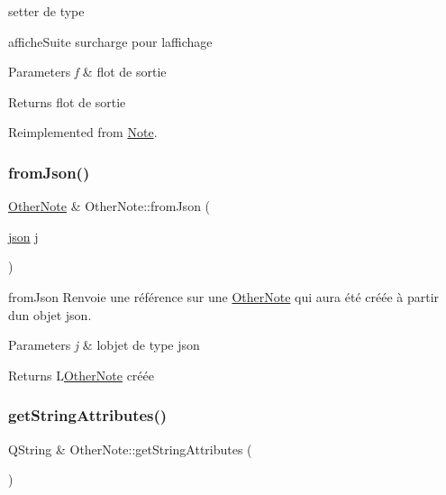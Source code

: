 setter de type 

affiche\+Suite surcharge pour l\textquotesingle{}affichage 
\begin{DoxyParams}{Parameters}
{\em f} & flot de sortie \\
\hline
\end{DoxyParams}
\begin{DoxyReturn}{Returns}
flot de sortie 
\end{DoxyReturn}


Reimplemented from \hyperlink{classNote_ad3c0d7e48ef8244ead577128993a6f1f}{Note}.

\mbox{\label{classOtherNote_ab0a366aa561a511646c6ac3340fd1009}} 
\subsubsection{\texorpdfstring{from\+Json()}{fromJson()}}
{\footnotesize\ttfamily \hyperlink{classOtherNote}{Other\+Note} \& Other\+Note\+::from\+Json (\begin{DoxyParamCaption}\item[{\hyperlink{classnlohmann_1_1basic__json}{json}}]{j }\end{DoxyParamCaption})\hspace{0.3cm}{\ttfamily [static]}}



from\+Json Renvoie une référence sur une \hyperlink{classOtherNote}{Other\+Note} qui aura été créée à partir d\textquotesingle{}un objet json. 


\begin{DoxyParams}{Parameters}
{\em j} & l\textquotesingle{}objet de type json \\
\hline
\end{DoxyParams}
\begin{DoxyReturn}{Returns}
L\textquotesingle{}\hyperlink{classOtherNote}{Other\+Note} créée 
\end{DoxyReturn}
\mbox{\label{classOtherNote_a3f475cf0cfc1a9cd8785618c0a7f3496}} 
\subsubsection{\texorpdfstring{get\+String\+Attributes()}{getStringAttributes()}}
{\footnotesize\ttfamily Q\+String \& Other\+Note\+::get\+String\+Attributes (\begin{DoxyParamCaption}{ }\end{DoxyParamCaption})\hspace{0.3cm}{\ttfamily [virtual]}}



